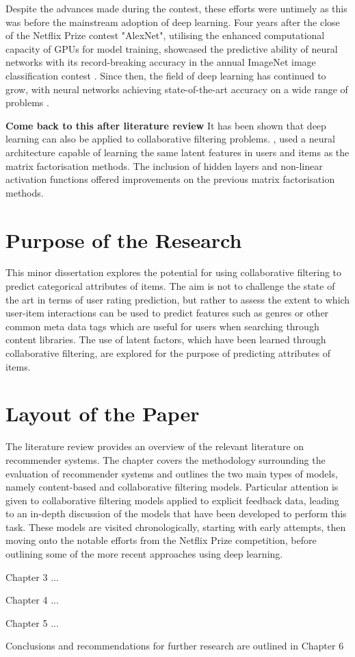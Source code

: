 Despite the advances made during the contest, these efforts were untimely as this was before the mainstream adoption of deep learning. Four years after the close of the Netflix Prize contest "AlexNet", utilising the enhanced computational capacity of GPUs for model training, showcased the predictive ability of neural networks with its record-breaking accuracy in the annual ImageNet image classification contest \parencite{krizhevsky2012imagenet}. Since then, the field of deep learning has continued to grow, with neural networks achieving state-of-the-art accuracy on a wide range of problems \parencite{alom2018history}.

\textbf{Come back to this after literature review}   
It has been shown that deep learning can also be applied to collaborative filtering problems. \cite{he2017neural}, used a neural architecture capable of learning the same latent features in users and items as the matrix factorisation methods. The inclusion of hidden layers and non-linear activation functions offered improvements on the previous matrix factorisation methods.

\section{Purpose of the Research}
This minor dissertation explores the potential for using collaborative filtering to predict categorical attributes of items. The aim is not to challenge the state of the art in terms of user rating prediction, but rather to assess the extent to which user-item interactions can be used to predict features such as genres or other common meta data tags which are useful for users when searching through content libraries. The use of latent factors, which have been learned through collaborative filtering, are explored for the purpose of predicting attributes of items.

\section{Layout of the Paper}
The literature review provides an overview of the relevant literature on recommender systems. The chapter covers the methodology surrounding the evaluation of recommender systems and outlines the two main types of models, namely content-based and collaborative filtering models. Particular attention is given to collaborative filtering models applied to explicit feedback data, leading to an in-depth discussion of the models that have been developed to perform this task. These models are visited chronologically, starting with early attempts, then moving onto the notable efforts from the Netflix Prize competition, before outlining some of the more recent approaches using deep learning.

Chapter 3 ...

Chapter 4 ...

Chapter 5 ...

Conclusions and recommendations for further research are outlined in Chapter 6


 